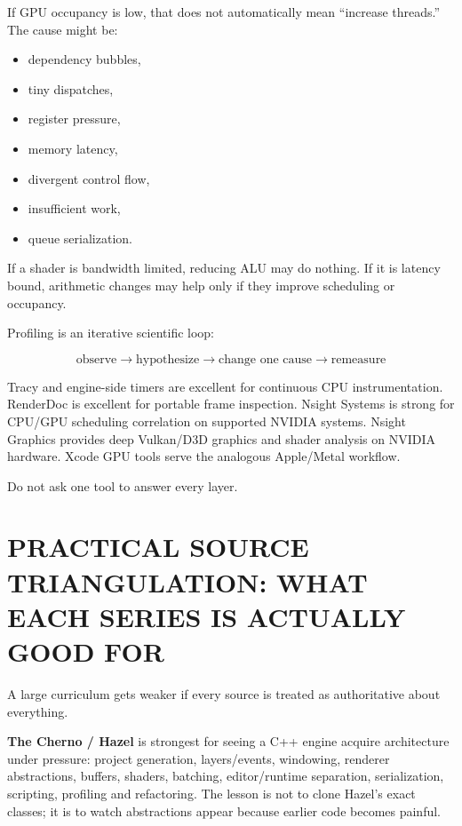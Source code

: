 \hypertarget{05-engine-i-ch008-use-counter-evidence-to-choose-the-next-experiment}{}

If GPU occupancy is low, that does not automatically mean ``increase threads.'' The cause might be:

\begin{itemize}
\tightlist
\item
  dependency bubbles,
\item
  tiny dispatches,
\item
  register pressure,
\item
  memory latency,
\item
  divergent control flow,
\item
  insufficient work,
\item
  queue serialization.
\end{itemize}

If a shader is bandwidth limited, reducing ALU may do nothing. If it is latency bound, arithmetic changes may help only if they improve scheduling or occupancy.

Profiling is an iterative scientific loop:

\[
\boxed{
\text{observe}
\rightarrow
\text{hypothesize}
\rightarrow
\text{change one cause}
\rightarrow
\text{remeasure}
}
\]

Tracy and engine-side timers are excellent for continuous CPU instrumentation. RenderDoc is excellent for portable frame inspection. Nsight Systems is strong for CPU/GPU scheduling correlation on supported NVIDIA systems. Nsight Graphics provides deep Vulkan/D3D graphics and shader analysis on NVIDIA hardware. Xcode GPU tools serve the analogous Apple/Metal workflow.

Do not ask one tool to answer every layer.

\section{PRACTICAL SOURCE TRIANGULATION: WHAT EACH SERIES IS ACTUALLY GOOD FOR}\label{05-engine-i-ch008-practical-source-triangulation-what-each-series-is-actually-good-for}

\hypertarget{05-engine-i-ch008-practical-source-triangulation-what-each-series-is-actually-good-for}{}

A large curriculum gets weaker if every source is treated as authoritative about everything.

\textbf{The Cherno / Hazel} is strongest for seeing a C++ engine acquire architecture under pressure: project generation, layers/events, windowing, renderer abstractions, buffers, shaders, batching, editor/runtime separation, serialization, scripting, profiling and refactoring. The lesson is not to clone Hazel's exact classes; it is to watch abstractions appear because earlier code becomes painful.

